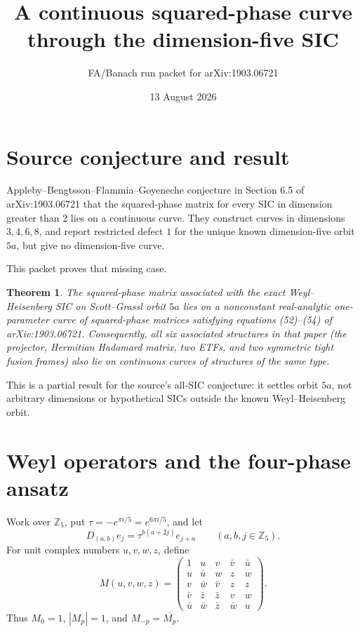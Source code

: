 \documentclass[11pt]{article}
\title{A continuous squared-phase curve through the dimension-five SIC}
\author{FA/Banach run packet for arXiv:1903.06721}
\date{13 August 2026}
\newtheorem{theorem}{Theorem}
\newcommand{\Z}{\mathbb Z}
\begin{document}
\maketitle

\section*{Source conjecture and result}

Appleby--Bengtsson--Flammia--Goyeneche conjecture in Section 6.5 of
arXiv:1903.06721 that the squared-phase matrix for every SIC in dimension
greater than 2 lies on a continuous curve. They construct curves in
dimensions \(3,4,6,8\), and report restricted defect \(1\) for the unique
known dimension-five orbit \(5a\), but give no dimension-five curve.

This packet proves that missing case.

\begin{theorem}\label{thm:main}
The squared-phase matrix associated with the exact Weyl--Heisenberg SIC on
Scott--Grassl orbit \(5a\) lies on a nonconstant real-analytic one-parameter
curve of squared-phase matrices satisfying equations (52)--(54) of
arXiv:1903.06721. Consequently, all six associated structures in that paper
(the projector, Hermitian Hadamard matrix, two ETFs, and two symmetric tight
fusion frames) also lie on continuous curves of structures of the same type.
\end{theorem}

This is a partial result for the source's all-SIC conjecture: it settles orbit
\(5a\), not arbitrary dimensions or hypothetical SICs outside the known
Weyl--Heisenberg orbit.

\section*{Weyl operators and the four-phase ansatz}

Work over \(\Z_5\), put \(\tau=-e^{\pi i/5}=e^{6\pi i/5}\), and let
\[
 D_{(a,b)}e_j=\tau^{b(a+2j)}e_{j+a}\qquad(a,b,j\in\Z_5).
\]
For unit complex numbers \(u,v,w,z\), define
\begin{equation}\label{eq:pattern}
 M(u,v,w,z)=
 \begin{pmatrix}
 1&u&v&\bar v&\bar u\\
 u&\bar u&w&z&w\\
 v&\bar w&\bar v&z&z\\
 \bar v&\bar z&\bar z&v&w\\
 \bar u&\bar w&\bar z&\bar w&u
 \end{pmatrix}.
\end{equation}
Thus \(M_0=1\), \(|M_p|=1\), and \(M_{-p}=\overline{M_p}\).
\end{document}
